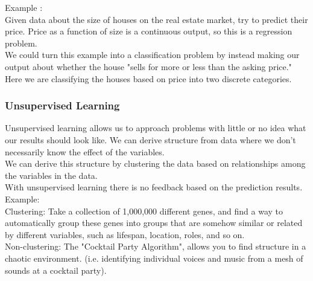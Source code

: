 \pagebreak

Example :\\

Given data about the size of houses on the real estate market, try to predict their price. Price as a function of size is a continuous output, so this is a regression problem.\\

We could turn this example into a classification problem by instead making our output about whether the house "sells for more or less than the asking price." Here we are classifying the houses based on price into two discrete categories.

\subsubsection*{Unsupervised Learning}

Unsupervised learning allows us to approach problems with little or no idea what our results should look like. We can derive structure from data where we don't necessarily know the effect of the variables.\\

We can derive this structure by clustering the data based on relationships among the variables in the data.\\

With unsupervised learning there is no feedback based on the prediction results.\\

Example:\\

Clustering: Take a collection of 1,000,000 different genes, and find a way to automatically group these genes into groups that are somehow similar or related by different variables, such as lifespan, location, roles, and so on.\\

Non-clustering: The "Cocktail Party Algorithm", allows you to find structure in a chaotic environment. (i.e. identifying individual voices and music from a mesh of sounds at a cocktail party).

